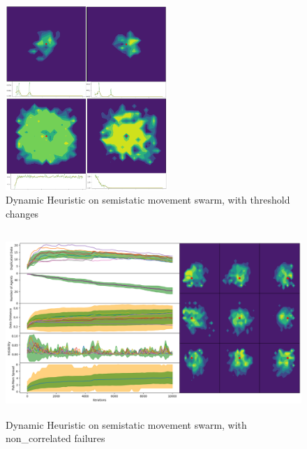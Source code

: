 \documentclass{UoYCSproject}
\begin{document}
\begin{figure}[htb]
\label{fig:Threshold_Changes2}
\begin{center}
\centering
\includegraphics[height=7cm]{"./Dynamic_Heuristic/Thresholdchanges.png"}
\caption{Dynamic Heuristic on semi\-static movement swarm, with threshold changes}
\end{center}
\end{figure}

\begin{figure}[htb]
\label{fig:static_movement_non2}
\begin{center}
\centering
\includegraphics[height=7cm]{"./Dynamic_Heuristic/Static_Move_non.png"}
\caption{Dynamic Heuristic on semi\-static movement swarm, with non\_correlated failures}
\end{center}
\end{figure}
\end{document}
